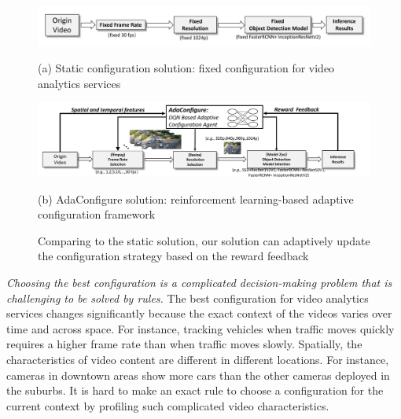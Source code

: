 \begin{figure}[!t]
	\begin{minipage}{\linewidth}
		\centerline{\includegraphics[width=0.9\linewidth]{figures/static_framework.pdf}}
		\begin{center}
			{(a) Static configuration solution: fixed configuration for video analytics services}
		\end{center}
	\end{minipage}
	\vfill
	\vspace{0.4cm}
	\begin{minipage}{\linewidth}
		\centerline{\includegraphics[width=0.9\linewidth]{figures/auto_framework.pdf}}
		\vspace{0.2cm}
		\begin{center}
			{(b) AdaConfigure solution: reinforcement learning-based adaptive configuration framework}
		\end{center}
	\end{minipage}
	\caption{Comparing to the static solution, our solution can adaptively update the configuration strategy based on the reward feedback}
	\label{fig: framework}
	\vspace{-0.5cm}
\end{figure}

\emph{Choosing the best configuration is a complicated decision-making problem that is challenging to be solved by rules.} The best configuration for video analytics services changes significantly because the exact context of the videos varies over time and across space. For instance, tracking vehicles when traffic moves quickly requires a higher frame rate than when traffic moves slowly. Spatially, the characteristics of video content are different in different locations. For instance, cameras in downtown areas show more cars than the other cameras deployed in the suburbs. It is hard to make an exact rule to choose a configuration for the current context by profiling such complicated video characteristics.

